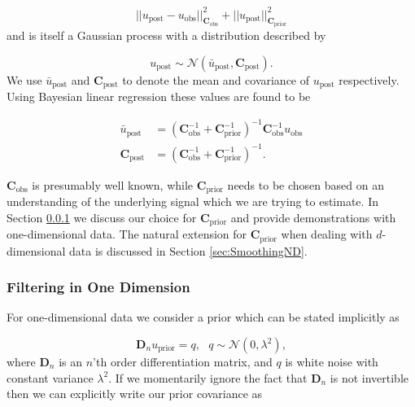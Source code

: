 \documentclass[10pt,a4paper]{article}
\begin{document}
\begin{equation}\label{eq:Objective}
||u_\mathrm{post} - u_\mathrm{obs}||_{\mathbf{C}_\mathrm{obs}}^2 + 
||u_\mathrm{post}||_{\mathbf{C}_\mathrm{prior}}^2
\end{equation}
and is itself a Gaussian process with a distribution described by

\begin{equation}
  u_\mathrm{post} \sim \mathcal{N}(\bar{u}_\mathrm{post},\mathbf{C}_\mathrm{post}).
\end{equation}
We use $\bar{u}_\mathrm{post}$ and $\mathbf{C}_\mathrm{post}$ to denote the mean and covariance of $u_\mathrm{post}$ respectively.  Using Bayesian linear regression \citep{Tarantola2005} these values are found to be  

\begin{equation}\label{eq:GeneralSolution}
\begin{split}
  \bar{u}_\mathrm{post} &= (\mathbf{C}_\mathrm{obs}^{-1} + 
                            \mathbf{C}_\mathrm{prior}^{-1})^{-1}
                            \mathbf{C}_\mathrm{obs}^{-1} u_\mathrm{obs}
\\
\mathbf{C}_\mathrm{post} &= (\mathbf{C}_\mathrm{obs}^{-1} + 
                             \mathbf{C}_\mathrm{prior}^{-1})^{-1}.                          
\end{split}
\end{equation}
 
$\mathbf{C}_\mathrm{obs}$ is presumably well known, while $\mathbf{C}_\mathrm{prior}$ needs to be chosen based on an understanding of the underlying signal which we are trying to estimate. In Section \ref{sec:Smoothing1D} we discuss our choice for $\mathbf{C}_\mathrm{prior}$ and provide demonstrations with one-dimensional data.  The natural extension for $\mathbf{C}_\mathrm{prior}$ when dealing with $d$-dimensional data is discussed in Section \ref{sec:SmoothingND}.  

\subsubsection{Filtering in One Dimension}\label{sec:Smoothing1D}
For one-dimensional data we consider a prior which can be stated implicitly as

\begin{equation}\label{eq:ImplicitPrior1D}
  \mathbf{D}_{n} u_\mathrm{prior} = q, \ \ \ q \sim \mathcal{N}(0,\lambda^2),
\end{equation}  
where $\mathbf{D}_n$ is an $n$'th order differentiation matrix, and $q$ is white noise with constant variance $\lambda^2$.  If we momentarily ignore the fact that $\mathbf{D}_n$ is not invertible then we can explicitly write our prior covariance as
\end{document}
